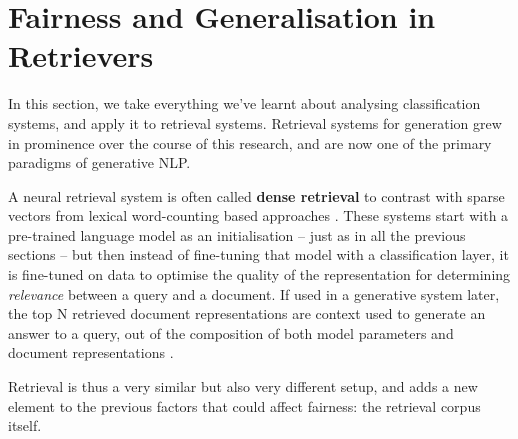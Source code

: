 \part{Fairness and Generalisation in Retrievers}
\label{part:generation}

In this section, we take everything we've learnt about analysing classification systems, and apply it to retrieval systems. 
Retrieval systems for generation grew in prominence over the course of this research, and are now one of the primary paradigms of generative NLP. 

A neural retrieval system is often called \textbf{dense retrieval} to contrast with sparse vectors from lexical word-counting based approaches \citep{BM25}. These systems start with a pre-trained language model as an initialisation -- just as in all the previous sections -- but then instead of fine-tuning that model with a classification layer, it is fine-tuned on data to optimise the quality of the representation for determining \textit{relevance} between a query and a document. If used in a generative system later, the top N retrieved document representations are context used to generate an answer to a query, out of the composition of both model parameters and document representations \citep{lewis2020retrieval, atlas_jmlr}. 

Retrieval is thus a very similar but also very different setup, and adds a new element to the previous factors that could affect fairness: the retrieval corpus itself. 



